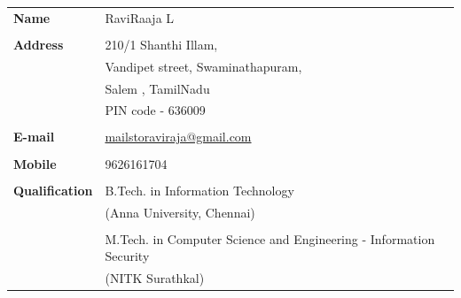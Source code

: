 \documentclass[a4paper,12pt, twoside]{NITKReport}
\begin{document}
\begin{table}[htbp]
	\centering
	\begin{adjustbox}{center}	
		\begin{tabular}{p{4cm} p{7cm}}
			\textbf{Name} & RaviRaaja L\\
			&\\
			\textbf{Address} & 210/1 Shanthi Illam,\\
			& Vandipet street, Swaminathapuram,\\
			& Salem , TamilNadu\\
			& PIN code - 636009\\
			&\\
			
			\textbf{E-mail} & \href{mailto:mailstoraviraaja@gmail.com}{mailstoraviraja@gmail.com}\\
			&\\
			
			\textbf{Mobile} & 9626161704\\
			&\\
			
			\textbf{Qualification} & B.Tech. in Information Technology\\
			& (Anna University, Chennai)\\
			&\\ 
            & M.Tech. in Computer Science and Engineering - Information Security\\
			& (NITK Surathkal)\\
		\end{tabular}
	\end{adjustbox}
\end{table}
\end{document}
